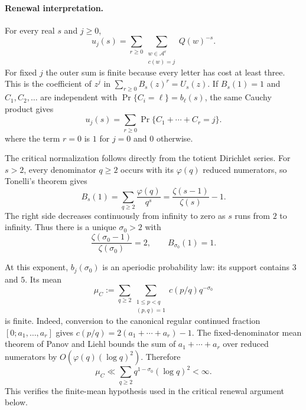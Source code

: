 \paragraph{Renewal interpretation.}
For every real \(s\) and \(j\ge0\),
\begin{equation}
 u_j(s)=\sum_{r\ge0}
 \sum_{\substack{w\in\mathcal A^r\\c(w)=j}}Q(w)^{-s}.
 \label{eq:renewal-coefficient-word-sum}
\end{equation}
For fixed \(j\) the outer sum is finite because every letter has cost at
least three.  This is the coefficient of \(z^j\) in
\(\sum_{r\ge0}B_s(z)^r=U_s(z)\).  If \(B_s(1)=1\) and
\(C_1,C_2,\ldots\) are independent with
\(\Pr\{C_i=\ell\}=b_\ell(s)\), the same Cauchy product gives
\begin{equation}
 u_j(s)=\sum_{r\ge0}\Pr\{C_1+\cdots+C_r=j\}.
 \label{eq:probabilistic-renewal-mass}
\end{equation}
where the term \(r=0\) is \(1\) for \(j=0\) and \(0\) otherwise.

The critical normalization follows directly from the totient Dirichlet
series.  For \(s>2\), every denominator \(q\ge2\) occurs with its
\(\varphi(q)\) reduced numerators, so Tonelli's theorem gives
\begin{equation}
 B_s(1)=\sum_{q\ge2}\frac{\varphi(q)}{q^s}
 =\frac{\zeta(s-1)}{\zeta(s)}-1.
 \label{eq:weighted-renewal-at-one}
\end{equation}
The right side decreases continuously from infinity to zero as \(s\) runs
from \(2\) to infinity.  Thus there is a unique \(\sigma_0>2\) with
\begin{equation}
 \frac{\zeta(\sigma_0-1)}{\zeta(\sigma_0)}=2,
 \qquad B_{\sigma_0}(1)=1.
 \label{eq:critical-renewal-normalization}
\end{equation}

At this exponent, \(b_j(\sigma_0)\) is an aperiodic probability law: its
support contains \(3\) and \(5\).  Its mean
\begin{equation}
 \mu_C:=\sum_{q\ge2}\sum_{\substack{1\le p<q\\(p,q)=1}}
 c(p/q)q^{-\sigma_0}
 \label{eq:critical-cost-mean}
\end{equation}
is finite.  Indeed, conversion to the canonical regular continued fraction
\([0;a_1,\ldots,a_r]\) gives
\(c(p/q)=2(a_1+\cdots+a_r)-1\).  The fixed-denominator mean theorem of
Panov and Liehl \cite{Panov1982,Liehl1983} bounds the sum of
\(a_1+\cdots+a_r\) over reduced numerators by
\(O(\varphi(q)(\log q)^2)\).  Therefore
\[
 \mu_C\ll\sum_{q\ge2}q^{1-\sigma_0}(\log q)^2<\infty.
\]
This verifies the finite-mean hypothesis used in the critical renewal
argument below.

